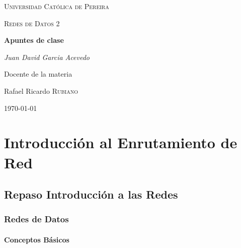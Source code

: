 \documentclass[a4paper]{report} %
\begin{document}
  \begin{titlepage}
    \centering
    {\scshape\LARGE Universidad Católica de Pereira\par}
    \vfill
    {\scshape\LARGE Redes de Datos 2\par}
    \vfill
    {\huge\bfseries Apuntes de clase\par}
    \vfill
    {\Large\itshape Juan David Garcia Acevedo\par}
    \vfill
    Docente de la materia\par
	  Rafael Ricardo \textsc{Rubiano}
    \vfill
    {\Large\today\par}
  \end{titlepage}
  \tableofcontents %
    \part{Introducción al Enrutamiento de Red}
      \chapter{Repaso Introducción a las Redes}
        \section{Redes de Datos}
          \subsection{Conceptos Básicos} 
\end{document}
